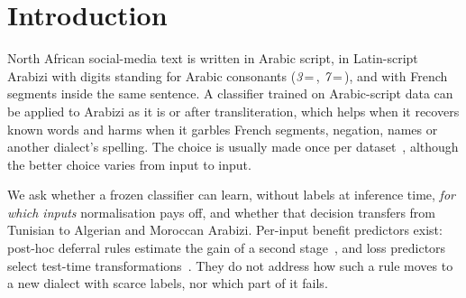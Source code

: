 \section{Introduction}
\label{sec:intro}

North African social-media text is written in Arabic script, in Latin-script Arabizi with digits standing for Arabic consonants (\textit{3}\,=\,, \textit{7}\,=\,), and with French segments inside the same sentence. A classifier trained on Arabic-script data can be applied to Arabizi as it is or after transliteration, which helps when it recovers known words and harms when it garbles French segments, negation, names or another dialect's spelling. The choice is usually made once per dataset~\cite{muller2021unseen,moosa2023transliteration,artetxe2023revisiting}, although the better choice varies from input to input.

We ask whether a frozen classifier can learn, without labels at inference time, \emph{for which inputs} normalisation pays off, and whether that decision transfers from Tunisian to Algerian and Moroccan Arabizi. Per-input benefit predictors exist: post-hoc deferral rules estimate the gain of a second stage~\cite{jitkrittum2023cascade}, and loss predictors select test-time transformations~\cite{kim2020learningloss}. They do not address how such a rule moves to a new dialect with scarce labels, nor which part of it fails.

